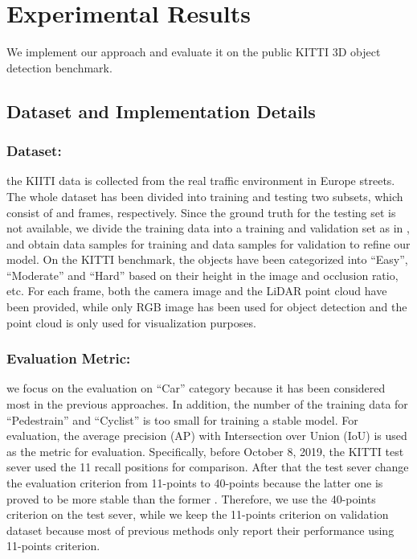 \section{Experimental Results}
We implement our approach and evaluate it on the public  KITTI \cite{geiger2012we} 3D object detection benchmark. 
\subsection{Dataset and Implementation Details}
\subsubsection{Dataset:} the KIITI data is collected from the real traffic environment in Europe streets. The whole dataset has been divided into training and testing two subsets, which consist of  and  frames, respectively. Since the ground truth for the testing set is not available, we divide the training data into a training and validation set as in \cite{yan2018second,zhou2018voxelnet}, and obtain  data samples for training and  data samples for validation to refine our model. On the KITTI benchmark, the objects have been categorized into ``Easy'', ``Moderate'' and ``Hard'' based on their height in the image and occlusion ratio, etc. For each frame, both the camera image and the LiDAR point cloud have been provided, while only RGB image has been used for object detection and the point cloud is only used for visualization purposes.

\subsubsection{Evaluation Metric:} we focus on the evaluation on ``Car'' category because it has been considered most in the previous approaches. In addition, the number of the training data for ``Pedestrain'' and ``Cyclist'' is too small for training a stable model. For evaluation, the average precision (AP) with Intersection over Union (IoU) is used as the metric for evaluation. Specifically, before October 8, 2019, the KITTI test sever used the 11 recall positions for comparison. After that the test sever change the evaluation criterion from 11-points to 40-points because the latter one is proved to be more stable than the former \cite{simonelli2019disentangling}. Therefore, we use the 40-points criterion on the test sever, while we keep the 11-points criterion on validation dataset because most of previous methods only report their performance using 11-points criterion.  

